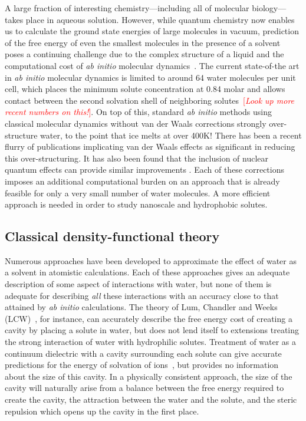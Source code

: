 \documentclass[letterpaper,twocolumn,amsmath,amssymb,prb]{revtex4-1}
\newcommand{\fixme}[1]{\textcolor{red}{[\emph{#1}]}}
\begin{document}
A large fraction of interesting chemistry---including all of molecular
biology---takes place in aqueous solution.  However, while quantum
chemistry now enables us to calculate the ground state energies of
large molecules in vacuum, prediction of the free energy of even the
smallest molecules in the presence of a solvent poses a continuing
challenge due to the complex structure of a liquid and the
computational cost of \emph{ab initio} molecular
dynamics~\cite{car1985, grossman2004}.  The current state-of-the art
in \emph{ab initio} molecular dynamics is limited to around 64 water
molecules per unit cell, which places the minimum solute concentration
at 0.84 molar and allows contact between the second solvation shell of
neighboring solutes~\cite{izvekov2005, choe2007}\fixme{Look up more
  recent numbers on this!}.  On top of this, standard \emph{ab initio}
methods using classical molecular dynamics without van der Waals
corrections strongly over-structure water, to the point that ice melts
at over 400K\cite{yoo2009phase}!  There has been a recent flurry of
publications implicating van der Waals effects as significant in
reducing this over-structuring\cite{lin2009importance,
  wang2011density, mogelhoj2011ab, jonchiere2011van}.  It has also
been found that the inclusion of nuclear quantum effects can provide
similar improvements \cite{morrone2008nuclear}.  Each of these
corrections imposes an additional computational burden on an approach
that is already feasible for only a very small number of water
molecules. A more efficient approach is needed in order to study
nanoscale and hydrophobic solutes.

\subsection{Classical density-functional theory}

Numerous approaches have been developed to approximate the effect of water
as a solvent in atomistic calculations.  Each of these approaches gives an
adequate description of some aspect of interactions with water, but none of
them is adequate for describing \emph{all} these interactions with an
accuracy close to that attained by \emph{ab initio} calculations.  The
theory of Lum, Chandler and Weeks (LCW)~\cite{lum1999hydrophobicity}, for 
instance, can
accurately describe the free energy cost of creating a cavity by placing a
solute in water, but does not lend itself to extensions treating the strong
interaction of water with hydrophilic solutes.  Treatment of water as a
continuum dielectric with a cavity surrounding each solute can give
accurate predictions for the energy of solvation of ions~\cite{latimer1939,
rashin1985, zhan1998, hsu1999, hildebrandt2004, hildebrandt2007}, but
provides no information about the size of this cavity.  In a physically
consistent approach, the size of the cavity will naturally arise from a
balance between the free energy required to create the cavity, the
attraction between the water and the solute, and the steric repulsion which
opens up the cavity in the first place.
\end{document}
